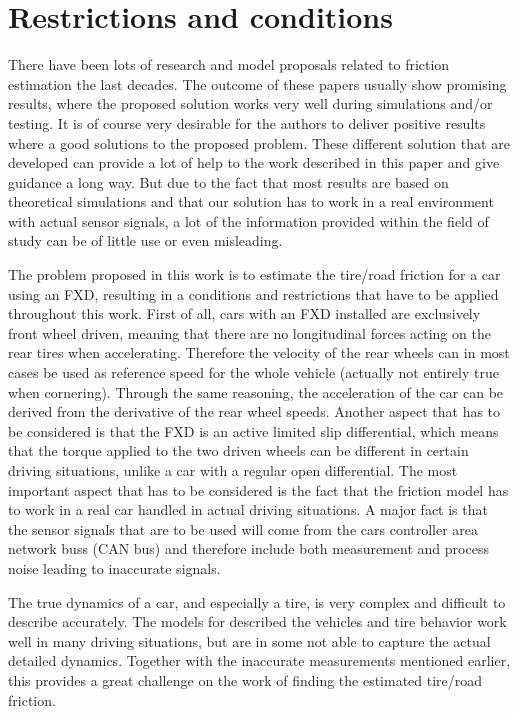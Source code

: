 \section{Restrictions and conditions}
There have been lots of research and model proposals related to friction estimation the last decades. The outcome of these papers usually show promising results, where the proposed solution works very well during simulations and/or testing. It is of course very desirable for the authors to deliver positive results where a good solutions to the proposed problem. These different solution that are developed can provide a lot of help to the work described in this paper and give guidance a long way. But due to the fact that most results are based on theoretical simulations and that our solution has to work in a real environment with actual sensor signals, a lot of the information provided within the field of study can be of little use or even misleading.

The problem proposed in this work is to estimate the tire/road friction for a car using an FXD, resulting in a conditions and restrictions that have to be applied throughout this work. First of all, cars with an FXD installed are exclusively front wheel driven, meaning that there are no longitudinal forces acting on the rear tires when accelerating. Therefore the velocity of the rear wheels can in most cases be used as reference speed for the whole vehicle (actually not entirely true when cornering). Through the same reasoning, the acceleration of the car can be derived from the derivative of the rear wheel speeds. Another aspect that has to be considered is that the FXD is an active limited slip differential, which means that the torque applied to the two driven wheels can be different in certain driving situations, unlike a car with a regular open differential. The most important aspect that has to be considered is the fact that the friction model has to work in a real car handled in actual driving situations. A major fact is that the sensor signals that are to be used  will come from the cars controller area network buss (CAN bus) and therefore include both measurement and process noise leading to inaccurate signals. 

The true dynamics of a car, and especially a tire, is very complex and difficult to describe accurately. The models for described the vehicles and tire behavior work well in many driving situations, but are in some not able to capture the actual detailed dynamics. Together with the inaccurate measurements mentioned earlier, this provides a great challenge on the work of finding the estimated tire/road friction. 

